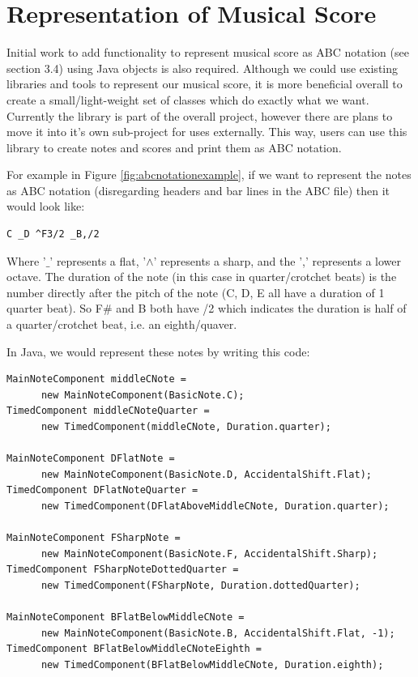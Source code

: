 \documentclass[pdftex,12pt,a4paper]{report}
\begin{document}
\section{Representation of Musical Score}
Initial work to add functionality to represent musical score as ABC notation (see section 3.4) using Java objects is also required. Although we could use existing libraries and tools to represent our musical score, it is more beneficial overall to create a small/light-weight set of classes which do exactly what we want. Currently the library is part of the overall project, however there are plans to move it into it's own sub-project for uses externally. This way, users can use this library to create notes and scores and print them as ABC notation.

For example in Figure \ref{fig:abcnotationexample}, if we want to represent the notes as ABC notation (disregarding headers and bar lines in the ABC file) then it would look like:

\begin{verbatim}
C _D ^F3/2 _B,/2
\end{verbatim}

Where '$\_$' represents a flat, '$\wedge$' represents a sharp, and the ',' represents a lower octave. The duration of the note (in this case in quarter/crotchet beats) is the number directly after the pitch of the note (C, D, E all have a duration of 1 quarter beat). So F\# and B both have /2 which indicates the duration is half of a quarter/crotchet beat, i.e. an eighth/quaver.

In Java, we would represent these notes by writing this code:

\begin{lstlisting}
MainNoteComponent middleCNote = 
      new MainNoteComponent(BasicNote.C);
TimedComponent middleCNoteQuarter = 
      new TimedComponent(middleCNote, Duration.quarter);

MainNoteComponent DFlatNote = 
      new MainNoteComponent(BasicNote.D, AccidentalShift.Flat);
TimedComponent DFlatNoteQuarter = 
      new TimedComponent(DFlatAboveMiddleCNote, Duration.quarter);

MainNoteComponent FSharpNote = 
      new MainNoteComponent(BasicNote.F, AccidentalShift.Sharp);
TimedComponent FSharpNoteDottedQuarter = 
      new TimedComponent(FSharpNote, Duration.dottedQuarter);

MainNoteComponent BFlatBelowMiddleCNote = 
      new MainNoteComponent(BasicNote.B, AccidentalShift.Flat, -1);
TimedComponent BFlatBelowMiddleCNoteEighth = 
      new TimedComponent(BFlatBelowMiddleCNote, Duration.eighth);

\end{lstlisting}
\end{document}
